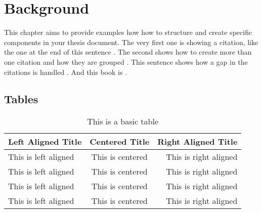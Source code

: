 \chapter{Background}\label{ch:background}
  This chapter aims to provide examples how how to structure and create specific components in your thesis document. The very first one is showing a citation, like the one at the end of this sentence \cite{patron_use_2016}. The second shows how to create more than one citation and how they are grouped \cite{zarifi_microwave_2016}.
This sentence shows how a gap in the citations is handled \cite{zarifi_time-resolved_2015}. And this book is \cite{stutzman2012antenna}. 
  \section{Tables}
  
  
  \begin{table}[!htb]
    \caption{This is a basic table}
    \centering
    \begin{tabularx}{0.75\textwidth}{LCR} 
      \hline
      \textbf{Left Aligned Title} & \textbf{Centered Title} & \textbf{Right Aligned Title} \\\hline
      This is left aligned & This is centered & This is right aligned \\
      This is left aligned & This is centered & This is right aligned \\
      This is left aligned & This is centered & This is right aligned \\
      This is left aligned & This is centered & This is right aligned \\\hline
    \end{tabularx}
    \label{tab:basicTable}
  \end{table}
  
